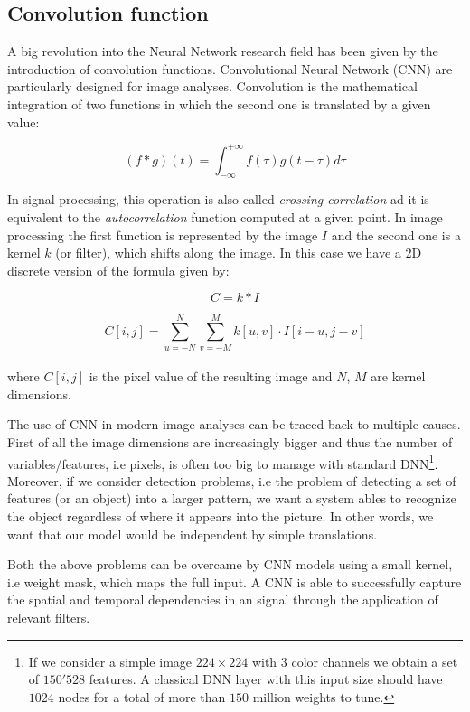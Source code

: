 \documentclass{standalone}
\begin{document}

\subsection[Convolution function]{Convolution function}\label{NN:convolutional}

A big revolution into the Neural Network research field has been given by the introduction of convolution functions.
Convolutional Neural Network (CNN) are particularly designed for image analyses.
Convolution is the mathematical integration of two functions in which the second one is translated by a given value:

$$
(f * g)(t) = \int_{-\infty}^{+\infty} f(\tau)g(t - \tau)d\tau
$$

In signal processing, this operation is also called \emph{crossing correlation} ad it is equivalent to the \emph{autocorrelation} function computed at a given point.
In image processing the first function is represented by the image $I$ and the second one is a kernel $k$ (or filter), which shifts along the image.
In this case we have a 2D discrete version of the formula given by:

$$
C = k * I
$$

$$
C[i, j] = \sum_{u=-N}^{N} \sum_{v=-M}^{M} k[u, v] \cdot I[i - u, j - v]
$$
\\
where $C[i, j]$ is the pixel value of the resulting image and $N$, $M$ are kernel dimensions.

The use of CNN in modern image analyses can be traced back to multiple causes.
First of all the image dimensions are increasingly bigger and thus the number of variables/features, i.e pixels, is often too big to manage with standard DNN\footnote{
  If we consider a simple image $224\times224$ with $3$ color channels we obtain a set of $150'528$ features.
  A classical DNN layer with this input size should have $1024$ nodes for a total of more than $150$ million weights to tune.
}.
Moreover, if we consider detection problems, i.e the problem of detecting a set of features (or an object) into a larger pattern, we want a system ables to recognize the object regardless of where it appears into the picture.
In other words, we want that our model would be independent by simple translations.

Both the above problems can be overcame by CNN models using a small kernel, i.e weight mask, which maps the full input.
A CNN is able to successfully capture the spatial and temporal dependencies in an signal through the application of relevant filters.
\end{document}
